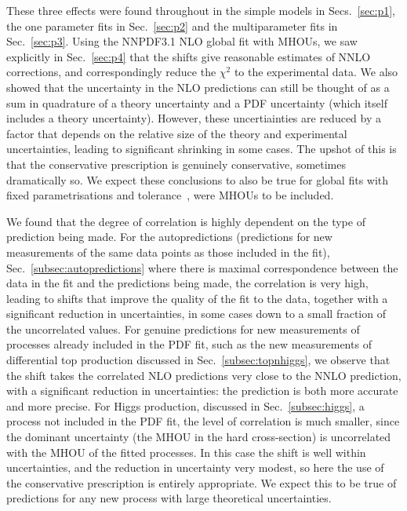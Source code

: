These three effects were found throughout in the simple models in Secs.~\ref{sec:p1}, the one parameter fits in Sec.~\ref{sec:p2} and the multiparameter fits in Sec.~\ref{sec:p3}. Using the NNPDF3.1 NLO global fit with MHOUs, we saw explicitly in Sec.~\ref{sec:p4} that the shifts give reasonable estimates of NNLO corrections, and correspondingly reduce the $\chi^2$ to the experimental data. We also showed that the uncertainty in the NLO predictions can still be thought of as a sum in quadrature of a theory uncertainty and a PDF uncertainty (which itself includes a theory uncertainty). However, these uncertiainties are reduced by a factor that depends on the relative size of the theory and experimental uncertainties, leading to significant shrinking in some cases. The upshot of this is that the conservative prescription is genuinely conservative, sometimes dramatically so. We expect these conclusions to also be true for global fits with fixed parametrisations and tolerance~\cite{Bailey:2020ooq,Hou:2019efy}, were MHOUs to be included. 

We found that the degree of correlation is highly dependent on the type of prediction being made. For the autopredictions (predictions for new measurements of the same data points as those included in the fit), Sec.~\ref{subsec:autopredictions} where there is maximal correspondence between the data in the fit and the predictions being made, the correlation is very high, leading to shifts that improve the quality of the fit to the data, together with a significant reduction in uncertainties, in some cases down to a small fraction of the uncorrelated values. For genuine predictions for new measurements of processes already included in the PDF fit, such as the new measurements of differential top production discussed in Sec.~\ref{subsec:topnhiggs}, we observe that the shift takes the correlated NLO predictions very close to the NNLO prediction, with a significant reduction in uncertainties: the prediction is both more accurate and more precise. For Higgs production, discussed in Sec.~\ref{subsec:higgs}, a process not included in the PDF  fit, the level of correlation is much smaller, since the dominant uncertainty (the MHOU in the hard cross-section) is uncorrelated with the MHOU of the fitted processes. In this case the shift is well within uncertainties, and the reduction in uncertainty very modest, so here the use of the conservative prescription \cite{AbdulKhalek:2019ihb} is entirely appropriate. We expect this to be true of predictions for any new process with large theoretical uncertainties.

